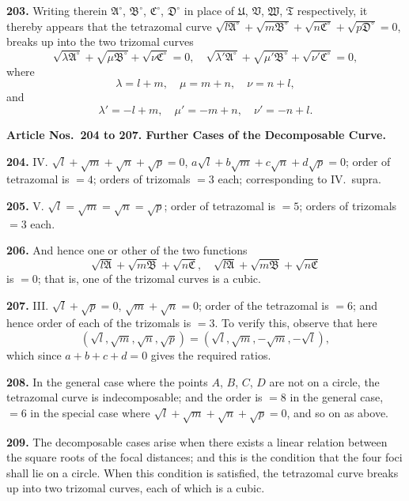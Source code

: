 \documentclass[12pt,a4paper]{article}
\theoremstyle{definition}
\begin{document}
\noindent\textbf{203.} Writing therein $\mathfrak{A}^\circ$, $\mathfrak{B}^\circ$, $\mathfrak{C}^\circ$, $\mathfrak{D}^\circ$ in place of $\mathfrak{U}$, $\mathfrak{V}$, $\mathfrak{W}$, $\mathfrak{T}$
respectively, it thereby appears that the tetrazomal curve $\sqrt{l\mathfrak{A}^\circ} + \sqrt{m\mathfrak{B}^\circ} + \sqrt{n\mathfrak{C}^\circ} + \sqrt{p\mathfrak{D}^\circ} = 0$,
breaks up into the two trizomal curves
\[
\sqrt{\lambda\mathfrak{A}^\circ} + \sqrt{\mu\mathfrak{B}^\circ} + \sqrt{\nu\mathfrak{C}^\circ} = 0, \quad
\sqrt{\lambda'\mathfrak{A}^\circ} + \sqrt{\mu'\mathfrak{B}^\circ} + \sqrt{\nu'\mathfrak{C}^\circ} = 0,
\]
where
\[
\lambda = l + m, \quad \mu = m + n, \quad \nu = n + l,
\]
and
\[
\lambda' = -l + m, \quad \mu' = -m + n, \quad \nu' = -n + l.
\]

\vspace{0.5em}
\noindent\textbf{Article Nos.~204 to 207. Further Cases of the Decomposable Curve.}

\vspace{0.3em}
\noindent\textbf{204.} IV. $\sqrt{l} + \sqrt{m} + \sqrt{n} + \sqrt{p} = 0$, $a\sqrt{l} + b\sqrt{m} + c\sqrt{n} + d\sqrt{p} = 0$;
order of tetrazomal is $= 4$; orders of trizomals $= 3$ each; corresponding to IV.\ supra.

\noindent\textbf{205.} V. $\sqrt{l} = \sqrt{m} = \sqrt{n} = \sqrt{p}$; order of tetrazomal is $= 5$; orders of
trizomals $= 3$ each.

\noindent\textbf{206.} And hence one or other of the two functions
\[
\sqrt{l\mathfrak{A}} + \sqrt{m\mathfrak{B}} + \sqrt{n\mathfrak{C}}, \quad \sqrt{l\mathfrak{A}} + \sqrt{m\mathfrak{B}} + \sqrt{n\mathfrak{C}}
\]
is $= 0$; that is, one of the trizomal curves is a cubic.

\noindent\textbf{207.} III. $\sqrt{l} + \sqrt{p} = 0$, $\sqrt{m} + \sqrt{n} = 0$; order of the tetrazomal is $= 6$;
and hence order of each of the trizomals is $= 3$. To verify this, observe that here
\[
(\sqrt{l}, \sqrt{m}, \sqrt{n}, \sqrt{p}) = (\sqrt{l}, \sqrt{m}, -\sqrt{m}, -\sqrt{l}),
\]
which since $a + b + c + d = 0$ gives the required ratios.

\newpage
\noindent\textbf{208.} In the general case where the points $A$, $B$, $C$, $D$ are not on a circle,
the tetrazomal curve is indecomposable; and the order is $= 8$ in the general case,
$= 6$ in the special case where $\sqrt{l} + \sqrt{m} + \sqrt{n} + \sqrt{p} = 0$, and so on as above.

\noindent\textbf{209.} The decomposable cases arise when there exists a linear relation between
the square roots of the focal distances; and this is the condition that the four foci
shall lie on a circle. When this condition is satisfied, the tetrazomal curve breaks up
into two trizomal curves, each of which is a cubic.
\end{document}
